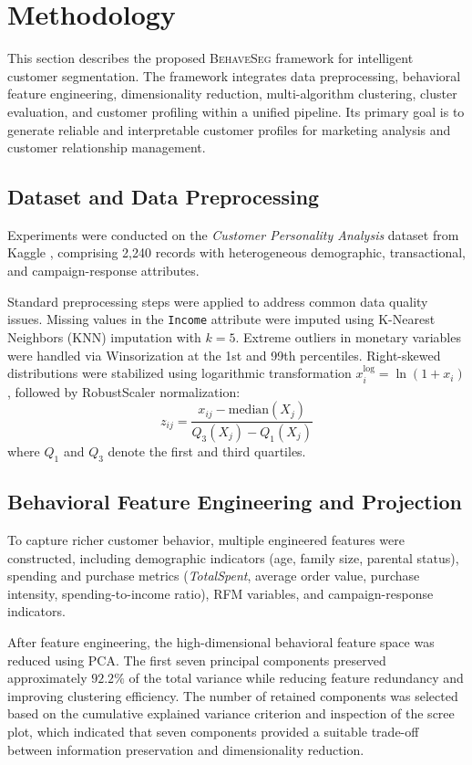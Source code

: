 \documentclass[twoside]{article}
\begin{document}
\section{Methodology}
\label{sec:methodology}

This section describes the proposed \textsc{BehaveSeg} framework for intelligent customer segmentation. The framework integrates data preprocessing, behavioral feature engineering, dimensionality reduction, multi-algorithm clustering, cluster evaluation, and customer profiling within a unified pipeline. Its primary goal is to generate reliable and interpretable customer profiles for marketing analysis and customer relationship management.

\subsection{Dataset and Data Preprocessing}

Experiments were conducted on the \textit{Customer Personality Analysis} dataset from Kaggle \cite{kaggle_cpa}, comprising 2,240 records with heterogeneous demographic, transactional, and campaign-response attributes.

Standard preprocessing steps were applied to address common data quality issues. Missing values in the \texttt{Income} attribute were imputed using K-Nearest Neighbors (KNN) imputation with \(k=5\). Extreme outliers in monetary variables were handled via Winsorization at the 1st and 99th percentiles. Right-skewed distributions were stabilized using logarithmic transformation \(x_i^{\log} = \ln(1 + x_i)\), followed by RobustScaler normalization:
\[
z_{ij} = \frac{x_{ij} - \mathrm{median}(X_j)}{Q_3(X_j) - Q_1(X_j)}\]
where \(Q_1\) and \(Q_3\) denote the first and third quartiles.
\subsection{Behavioral Feature Engineering and Projection}

To capture richer customer behavior, multiple engineered features were constructed, including demographic indicators (age, family size, parental status), spending and purchase metrics (\textit{TotalSpent}, average order value, purchase intensity, spending-to-income ratio), RFM variables, and campaign-response indicators. 

After feature engineering, the high-dimensional behavioral feature space was reduced using PCA. The first seven principal components preserved approximately \(92.2\%\) of the total variance while reducing feature redundancy and improving clustering efficiency. The number of retained components was selected based on the cumulative explained variance criterion and inspection of the scree plot, which indicated that seven components provided a suitable trade-off between information preservation and dimensionality reduction.
\end{document}
